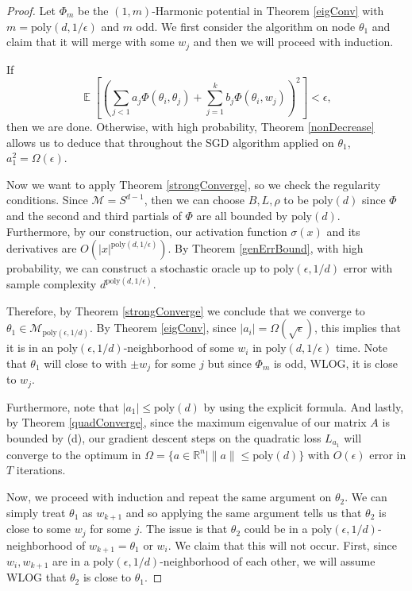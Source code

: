 \documentclass[a4paper,UKenglish]{lipics-v2016}
\newcommand{\poly}{\mathrm{poly}}
\newcommand{\R}{{\mathbb{R}}}
\DeclareMathOperator*{\expt}{\mathbb{E}}
\begin{document}
\begin{proof}
Let $\Phi_m$ be the $(1,m)$-Harmonic potential in Theorem \ref{eigConv} with $m = \poly(d,1/\epsilon)$ and $m$ odd. We first consider the algorithm on node $\theta_1$ and claim that it will merge with some $w_j$ and then we will proceed with induction. 


If
%
\[ \expt\left[\left( \sum_{j < 1} a_j \Phi(\theta_i,\theta_j) +
    \sum_{j=1}^k b_j \Phi(\theta_i,w_j)\right)^2\right] < \epsilon,\]
then we are done. Otherwise, with high probability, Theorem
\ref{nonDecrease} allows us to deduce that throughout the SGD
algorithm applied on $\theta_1$, $a_1^2 = \Omega(\epsilon)$.

Now we want to apply Theorem \ref{strongConverge}, so we check the regularity conditions. Since $\mathcal{M} = S^{d-1}$, then we can choose $B, L, \rho$ to be $\poly(d)$ since $\Phi$ and the second and third partials of $\Phi$ are all bounded by $\poly(d)$. Furthermore, by our construction, our activation function $\sigma(x)$ and its derivatives are $O(|x|^{\poly(d,1/\epsilon)})$. By Theorem \ref{genErrBound}, with high probability, we can construct a stochastic oracle up to $\poly(\epsilon,1/d)$ error with sample complexity $d^{\poly(d,1/\epsilon)}$.


Therefore, by Theorem \ref{strongConverge} we conclude that we converge to $\theta_1 \in \mathcal{M}_{\poly(\epsilon,1/d)}$. By Theorem \ref{eigConv}, since $|a_i| = \Omega(\sqrt{\epsilon})$, this implies that it is in an $\poly(\epsilon,1/d)$-neighborhood of some $w_{i}$ in $\poly(d,1/\epsilon)$ time. Note that $\theta_1$ will close to with $\pm w_j$ for some $j$ but since $\Phi_m$ is odd, WLOG, it is close to $w_j$. 

Furthermore, note that $|a_1| \leq \poly(d)$ by using the explicit formula. And lastly, by Theorem \ref{quadConverge}, since the maximum eigenvalue of our matrix $A$ is bounded by \poly(d), our gradient descent steps on the quadratic loss $L_{a_1}$ will converge to the optimum in $\Omega = \{a \in \R^n | \|a\| \leq \poly(d)\}$ with $O(\epsilon)$ error in $T$ iterations.

Now, we proceed with induction and repeat the same argument on $\theta_2$. We can simply treat $\theta_1$ as $w_{k+1}$ and so applying the same argument tells us that $\theta_2$ is close to some $w_j$ for some $j$. The issue is that $\theta_2$ could be in a $\poly(\epsilon,1/d)$-neighborhood of $w_{k+1} = \theta_1$ or $w_i$. We claim that this will not occur. First, since $w_i, w_{k+1}$ are in a $\poly(\epsilon,1/d)$-neighborhood of each other, we will assume WLOG that $\theta_2$ is close to $\theta_1$.


\end{proof}
\end{document}
